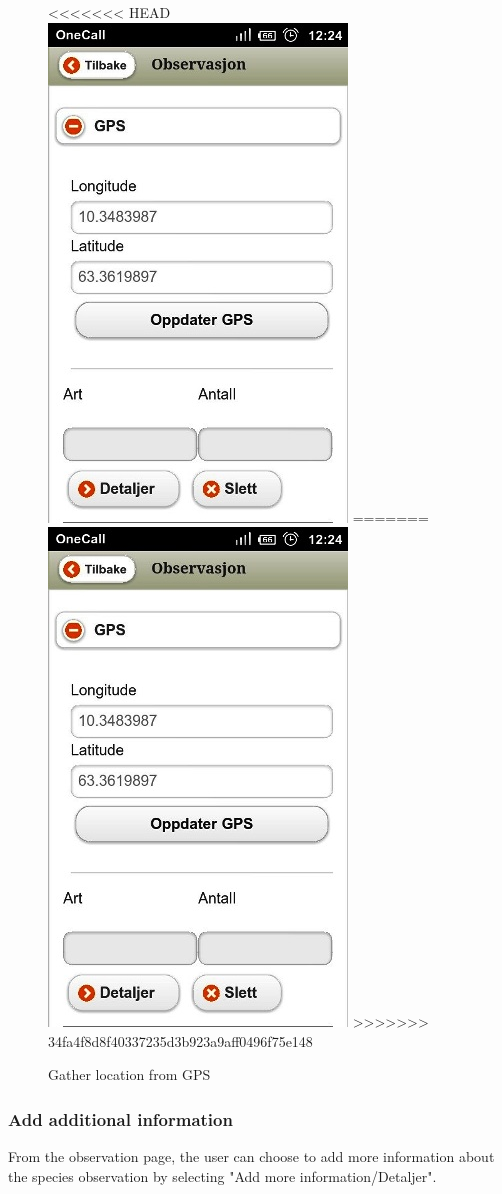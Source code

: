 \begin{figure}[h!]
\centering
<<<<<<< HEAD
 \includegraphics[scale=0.7]{appendix/pic/gps.jpg}
=======
 \includegraphics[height=0.7\textwidth]{appendix/pic/gps.jpg} 
>>>>>>> 34fa4f8d8f40337235d3b923a9aff0496f75e148
 \caption{Gather location from GPS}
 \end{figure}

\pagebreak

\subsubsection{Add additional information}
From the observation page, the user can choose to add more information about the species observation by selecting "Add more information/Detaljer".

